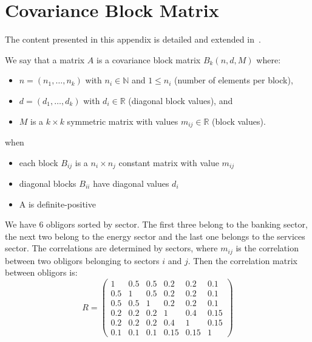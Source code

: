 \documentclass[11pt,fleqn]{book} %
\begin{document}
\section{Covariance Block Matrix}
\label{ap:cbm}

The content presented in this appendix is detailed and extended 
in~\cite{torrent:2012}.

\begin{definition}
	We say that a matrix $A$ is a covariance block matrix $B_k(n,d,M)$ where:
	\begin{itemize}
		\item $n=(n_1,\dots,n_k)$ with $n_i \in \mathbb{N}$ and $1 \le n_i$ (number of elements per block),
		\item $d=(d_1,\dots,d_k)$ with $d_i \in \mathbb{R}$ (diagonal block values), and
		\item $M$ is a $k {\times} k$ symmetric matrix with values $m_{ij} \in \mathbb{R}$ (block values).
	\end{itemize}
	when
	\begin{itemize}
		\item each block $B_{ij}$ is a $n_i {\times} n_j$ constant matrix with value $m_{ij}$
		\item diagonal blocks $B_{ii}$ have diagonal values $d_i$
		\item A is definite-positive
	\end{itemize}
\end{definition}

\begin{example}
	\label{example1}
	We have $6$ obligors sorted by sector. The first three belong to the 
	banking sector, the next two belong to the energy sector 
	and the last one belongs to the services sector. The correlations are 
	determined by sectors, where $m_{ij}$ is the correlation between two 
	obligors belonging to sectors $i$ and $j$. Then the correlation matrix 
	between obligors is:
	\begin{displaymath}
		R=
		\left(
		\begin{array}{ccc|cc|c} 
			1   & 0.5 & 0.5 & 0.2  & 0.2  & 0.1  \\ 
			0.5 & 1   & 0.5 & 0.2  & 0.2  & 0.1  \\ 
			0.5 & 0.5 & 1   & 0.2  & 0.2  & 0.1  \\ 
			\hline
			0.2 & 0.2 & 0.2 & 1    & 0.4  & 0.15 \\ 
			0.2 & 0.2 & 0.2 & 0.4  & 1    & 0.15 \\ 
			\hline
			0.1 & 0.1 & 0.1 & 0.15 & 0.15 & 1    
		\end{array} 
		\right)
	\end{displaymath}
\end{example}
\end{document}

